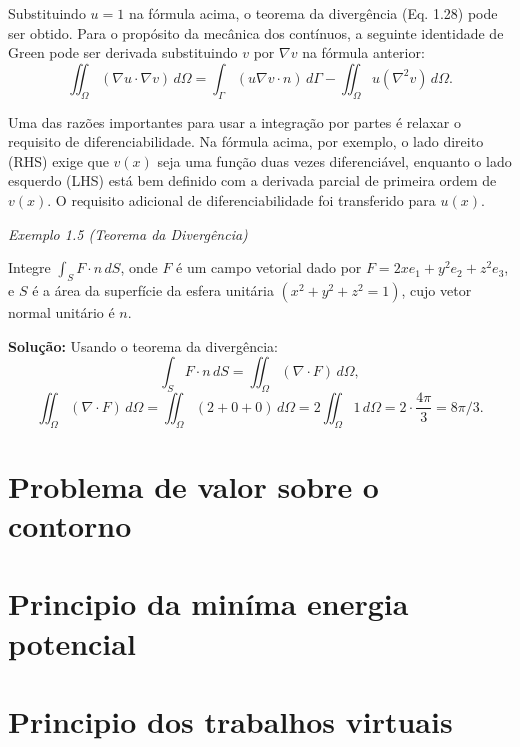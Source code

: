 {	Substituindo $u = 1$ na fórmula acima, o teorema da divergência (Eq. 1.28) pode ser obtido. Para o propósito da mecânica dos contínuos, a seguinte identidade de Green pode ser derivada substituindo $v$ por $\nabla v$ na fórmula anterior:
	\begin{equation}
		\iint_\Omega (\nabla u \cdot \nabla v) \, d\Omega = \int_\Gamma (u \nabla v \cdot n) \, d\Gamma - \iint_\Omega u (\nabla^2 v) \, d\Omega. \tag{1.31}
	\end{equation}
	
	Uma das razões importantes para usar a integração por partes é relaxar o requisito de diferenciabilidade. Na fórmula acima, por exemplo, o lado direito (RHS) exige que $v(x)$ seja uma função duas vezes diferenciável, enquanto o lado esquerdo (LHS) está bem definido com a derivada parcial de primeira ordem de $v(x)$. O requisito adicional de diferenciabilidade foi transferido para $u(x)$.
	
	\emph{Exemplo 1.5 (Teorema da Divergência)}
	
	Integre $ \int_S F \cdot n \, dS $, onde $F$ é um campo vetorial dado por $F = 2x e_1 + y^2 e_2 + z^2 e_3$, e $S$ é a área da superfície da esfera unitária $(x^2 + y^2 + z^2 = 1)$, cujo vetor normal unitário é $n$.
	
	\textbf{Solução:} Usando o teorema da divergência:
	\begin{equation}
		\int_S F \cdot n \, dS = \iint_\Omega (\nabla \cdot F) \, d\Omega,
	\end{equation}
	\begin{equation}
		\iint_\Omega (\nabla \cdot F) \, d\Omega = \iint_\Omega \left( 2 + 0 + 0 \right) \, d\Omega = 2 \iint_\Omega 1 \, d\Omega = 2 \cdot \frac{4\pi}{3} = 8\pi / 3.
	\end{equation}
}

\section{Problema de valor sobre o contorno}

\section{Principio da miníma energia potencial}

\section{Principio dos trabalhos virtuais}

\nocite{malvern1969introduction}
\nocite{boresi2002advanced}
\printbibliography[heading=subbibliography,segment=\therefsegment]
